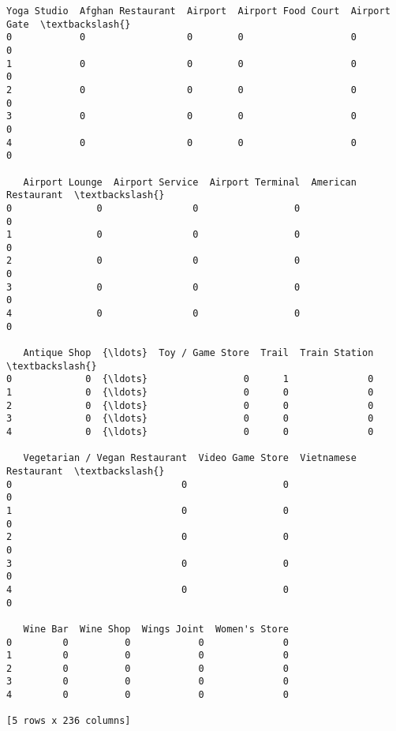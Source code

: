 \documentclass[11pt]{article}
\makeatletter
\newcommand{\boxspacing}{\kern\kvtcb@left@rule\kern\kvtcb@boxsep}
\newcommand{\prompt}[4]{
        \ttfamily\llap{{\color{#2}[#3]:\hspace{3pt}#4}}\vspace{-\baselineskip}
    }
\makeatother
\begin{document}
            \begin{tcolorbox}[breakable, size=fbox, boxrule=.5pt, pad at break*=1mm, opacityfill=0]
\prompt{Out}{outcolor}{39}{\boxspacing}
\begin{Verbatim}[commandchars=\\\{\}]
   Yoga Studio  Afghan Restaurant  Airport  Airport Food Court  Airport Gate  \textbackslash{}
0            0                  0        0                   0             0
1            0                  0        0                   0             0
2            0                  0        0                   0             0
3            0                  0        0                   0             0
4            0                  0        0                   0             0

   Airport Lounge  Airport Service  Airport Terminal  American Restaurant  \textbackslash{}
0               0                0                 0                    0
1               0                0                 0                    0
2               0                0                 0                    0
3               0                0                 0                    0
4               0                0                 0                    0

   Antique Shop  {\ldots}  Toy / Game Store  Trail  Train Station  \textbackslash{}
0             0  {\ldots}                 0      1              0
1             0  {\ldots}                 0      0              0
2             0  {\ldots}                 0      0              0
3             0  {\ldots}                 0      0              0
4             0  {\ldots}                 0      0              0

   Vegetarian / Vegan Restaurant  Video Game Store  Vietnamese Restaurant  \textbackslash{}
0                              0                 0                      0
1                              0                 0                      0
2                              0                 0                      0
3                              0                 0                      0
4                              0                 0                      0

   Wine Bar  Wine Shop  Wings Joint  Women's Store
0         0          0            0              0
1         0          0            0              0
2         0          0            0              0
3         0          0            0              0
4         0          0            0              0

[5 rows x 236 columns]
\end{Verbatim}
\end{tcolorbox}
        
\end{document}
